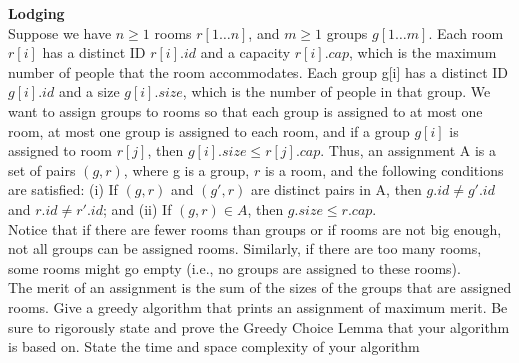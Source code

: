 \textbf{Lodging} \\
Suppose we have $n \geq 1$ rooms $r[1 \ldots n]$, and $m \geq 1$ groups $g[1 \ldots m]$. Each room $r[i]$ has a distinct ID
$r[i].id$ and a capacity $r[i].cap$, which is the maximum number of people that the room accommodates.
Each group g[i] has a distinct ID $g[i].id$ and a size $g[i].size$, which is the number of people in that group.
We want to assign groups to rooms so that each group is assigned to at most one room, at most one
group is assigned to each room, and if a group $g[i]$ is assigned to room $r[j]$, then $g[i].size \leq r[j].cap$.
Thus, an assignment A is a set of pairs $(g, r)$, where g is a group, $r$ is a room, and the following conditions
are satisfied: (i) If $(g, r)$ and $(g', r)$ are distinct pairs in A, then $g.id  \ne g'.id$ and $r.id  \ne r'.id$; and (ii)
If $(g, r) \in A$, then $g.size \leq r.cap$.\\

Notice that if there are fewer rooms than groups or if rooms are not big enough, not all groups can be
assigned rooms. Similarly, if there are too many rooms, some rooms might go empty (i.e., no groups
are assigned to these rooms). \\

The merit of an assignment is the sum of the sizes of the groups that are assigned rooms. Give a
greedy algorithm that prints an assignment of maximum merit. Be sure to rigorously state and prove
the Greedy Choice Lemma that your algorithm is based on. State the time and space complexity of
your algorithm

